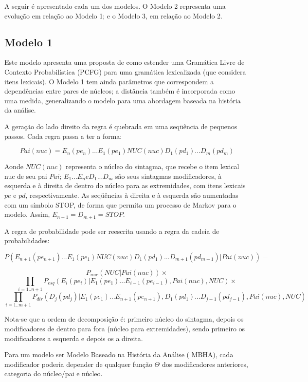 A seguir é apresentado cada um dos modelos. O Modelo 2 representa uma
evolução em relação ao Modelo 1; e o Modelo 3, em relação ao Modelo 2.


\subsection{Modelo 1}
\label{sub:modelo1}


Este modelo apresenta uma proposta de como estender uma Gramática Livre de Contexto Probabilística (PCFG) para uma gramática lexicalizada (que considera itens lexicais). O Modelo 1 tem ainda parâmetros que correspondem a dependências entre pares de núcleos; a distância também é incorporada como uma medida, generalizando o modelo para uma abordagem baseada na história da análise.

A geração do lado direito da regra é quebrada em uma seqüência de pequenos passos. Cada regra passa a ter a forma:


$$Pai(nuc) = E_n(pe_n)...E_1(pe_1)NUC(nuc)D_1(pd_1)...D_m(pd_m)$$


Aonde $NUC(nuc)$ representa o núcleo do sintagma, que recebe o item lexical nuc de seu pai $Pai$; $E_1...E_n e D_1...D_m$ são seus sintagmas modificadores, à esquerda e à direita de dentro do núcleo para as extremidades, com itens lexicais $pe$ e $pd$, respectivamente. As seqüências à direita e à esquerda são aumentadas com um símbolo STOP, de forma que permita um processo de Markov para o modelo. Assim, $ E_{n+1} = D_{m+1} = STOP $.

A regra de probabilidade pode ser reescrita usando a regra da cadeia de probabilidades:

$$P(E_{n+1}(pe_{n+1})...E_1(pe_1)NUC(nuc)D_1(pd_1)...D_{m+1}(pd_{m+1})|Pai(nuc)) = $$

$$P_{nuc}(NUC|Pai(nuc)) \times $$
$$\prod_{i=1..n+1} P_{esq}(E_i(pe_i)|E_1(pe_1)...E_{i-1}(pe_{i-1}), Pai(nuc),NUC) \times $$
$$\prod_{i=1..m+1} P_{dir}(D_j(pd_j)|E_1(pe_1)...E_{n+1}(pe_{n+1}),D_1(pd_1)...D_{j-1}(pd_{j-1}), Pai(nuc),NUC)  $$

Nota-se que a ordem de decomposição é: primeiro núcleo do sintagma, depois os modificadores de dentro para fora (núcleo para extremidades), sendo primeiro os modificadores a esquerda e depois os a direita.

Para um modelo ser Modelo Baseado na História da Análise ( MBHA), cada modificador poderia depender de qualquer função $\Theta$ dos modificadores anteriores, categoria do núcleo/pai e núcleo.

